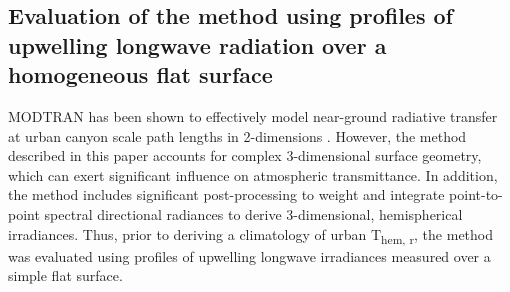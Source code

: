 \begin{bibunit}
\section{Evaluation of the method using profiles of upwelling longwave radiation over a homogeneous flat surface} \label{sensitivity}

MODTRAN has been shown to effectively model near-ground radiative transfer at urban canyon scale path lengths in 2-dimensions \citep{Hoch2005, Hoch2007}. However, the method described in this paper accounts for complex 3-dimensional surface geometry, which can exert significant influence on atmospheric transmittance. In addition, the method includes significant post-processing to weight and integrate point-to-point spectral directional radiances to derive 3-dimensional, hemispherical irradiances. Thus, prior to deriving a climatology of urban T\textsubscript{hem, r}, the method was evaluated using profiles of upwelling longwave irradiances measured over a simple flat surface.



\end{bibunit}

